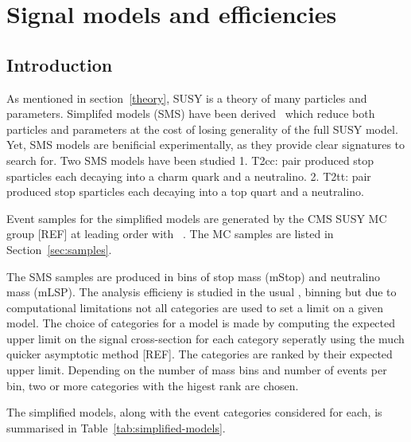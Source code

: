 \clearpage
\section{Signal models and efficiencies\label{sec:signal}}

\subsection{Introduction}

As mentioned in section~\ref{theory}, SUSY is a theory of many particles
and parameters.  Simplifed models (SMS) have been derived~\cite{Alwall:2008ag,Alwall:2008va,sms}
which reduce both particles and parameters at the cost of losing 
generality of the full SUSY model. Yet, SMS models are benificial experimentally,
as they provide clear signatures to search for.  Two SMS models have been studied
1. T2cc: pair produced stop sparticles each decaying into a charm quark and a neutralino.
2. T2tt: pair produced stop sparticles each decaying into a top quart and a neutralino.

Event samples for the simplified models are generated by the CMS SUSY MC group
[REF] at leading order with \MADGRAPH~\cite{madgraph}. %
The MC samples are listed in Section~\ref{sec:samples}.

The SMS samples are produced in bins of stop mass (mStop) and neutralino
mass (mLSP). The analysis efficieny is studied in the usual \njet, \nb binning
but due to computational limitations not all categories are used to set 
a limit on a given model. The choice of categories for a model is made by
computing the expected upper limit on the signal cross-section for each
category seperatly using the much quicker asymptotic method [REF]. The categories
are ranked by their expected upper limit. Depending on the number of 
mass bins and number of events per bin, two or more categories with the 
higest rank are chosen.

The simplified models, along with the event categories considered for each,
is summarised in Table~\ref{tab:simplified-models}.


